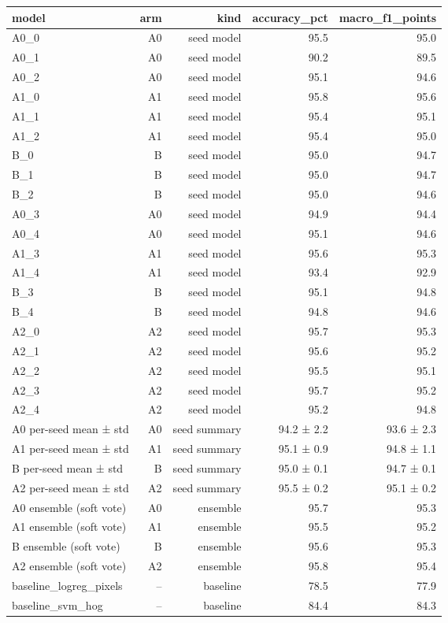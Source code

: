 \begin{tabular}{lrrrr}
\toprule
model & arm & kind & accuracy\_pct & macro\_f1\_points \\
\midrule
A0\_0 & A0 & seed model & 95.5 & 95.0 \\
A0\_1 & A0 & seed model & 90.2 & 89.5 \\
A0\_2 & A0 & seed model & 95.1 & 94.6 \\
A1\_0 & A1 & seed model & 95.8 & 95.6 \\
A1\_1 & A1 & seed model & 95.4 & 95.1 \\
A1\_2 & A1 & seed model & 95.4 & 95.0 \\
B\_0 & B & seed model & 95.0 & 94.7 \\
B\_1 & B & seed model & 95.0 & 94.7 \\
B\_2 & B & seed model & 95.0 & 94.6 \\
A0\_3 & A0 & seed model & 94.9 & 94.4 \\
A0\_4 & A0 & seed model & 95.1 & 94.6 \\
A1\_3 & A1 & seed model & 95.6 & 95.3 \\
A1\_4 & A1 & seed model & 93.4 & 92.9 \\
B\_3 & B & seed model & 95.1 & 94.8 \\
B\_4 & B & seed model & 94.8 & 94.6 \\
A2\_0 & A2 & seed model & 95.7 & 95.3 \\
A2\_1 & A2 & seed model & 95.6 & 95.2 \\
A2\_2 & A2 & seed model & 95.5 & 95.1 \\
A2\_3 & A2 & seed model & 95.7 & 95.2 \\
A2\_4 & A2 & seed model & 95.2 & 94.8 \\
A0 per-seed mean ± std & A0 & seed summary & 94.2 ± 2.2 & 93.6 ± 2.3 \\
A1 per-seed mean ± std & A1 & seed summary & 95.1 ± 0.9 & 94.8 ± 1.1 \\
B per-seed mean ± std & B & seed summary & 95.0 ± 0.1 & 94.7 ± 0.1 \\
A2 per-seed mean ± std & A2 & seed summary & 95.5 ± 0.2 & 95.1 ± 0.2 \\
A0 ensemble (soft vote) & A0 & ensemble & 95.7 & 95.3 \\
A1 ensemble (soft vote) & A1 & ensemble & 95.5 & 95.2 \\
B ensemble (soft vote) & B & ensemble & 95.6 & 95.3 \\
A2 ensemble (soft vote) & A2 & ensemble & 95.8 & 95.4 \\
baseline\_logreg\_pixels & -- & baseline & 78.5 & 77.9 \\
baseline\_svm\_hog & -- & baseline & 84.4 & 84.3 \\
\bottomrule
\end{tabular}
